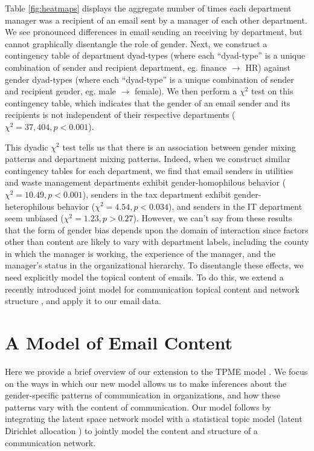 \documentclass{pnastwo}
\begin{document}
\begin{article}
	
Table \ref{fig:heatmaps} displays the aggregate number of times each department manager was a recipient of an email sent by a manager of each other department. We see pronounced differences in email sending an receiving by department, but cannot graphically disentangle the role of gender. 
Next, we construct a contingency table of department dyad-types (where each ``dyad-type'' is a unique combination of sender and recipient department, eg. finance $\longrightarrow$ HR) against gender dyad-types (where each ``dyad-type'' is a unique combination of sender and recipient gender, eg. male $\longrightarrow$ female).  We then perform a $\chi^2$ test on this contingency table, which indicates that the gender of an email sender and its recipients is not independent of their respective departments ($\chi^2 = 37,404, p < 0.001$).
	
	
This dyadic $\chi^2$ test tells us that there is an association between gender mixing patterns and department mixing patterns. Indeed, when we construct similar contingency tables for each department, we find that email senders in utilities and waste management departments exhibit gender-homophilous behavior ($\chi^2 = 10.49, p < 0.001$), senders in the tax department exhibit gender-heterophilous behavior ($\chi^2 = 4.54, p < 0.034$), and senders in the IT department seem unbiased ($\chi^2 = 1.23, p > 0.27$). However, we can't say from these results that the form of gender bias depends upon the domain of interaction since factors other than content are likely to vary with department labels, including the county in which the manager is working, the experience of the manager, and the manager's status in the organizational hierarchy. To disentangle these effects, we need explicitly model the topical content of emails. To do this, we extend a recently introduced joint model for communication topical content and network structure \citep{Krafft2012}, and apply it to our email data.
	


\section{A Model of Email Content}
Here we provide a brief overview of our extension to the TPME model \citep{Krafft2012}. We focus on the ways in which our new model allows us to make inferences about the gender-specific patterns of communication in organizations, and how these patterns vary with the content of communication. Our model follows \citep{Krafft2012} by integrating the latent space network model \citep{Hoff2002a} with a statistical topic model (latent Dirichlet allocation \cite{Blei2003}) to jointly model the content and structure of a communication network. 


\end{article}
\end{document}
